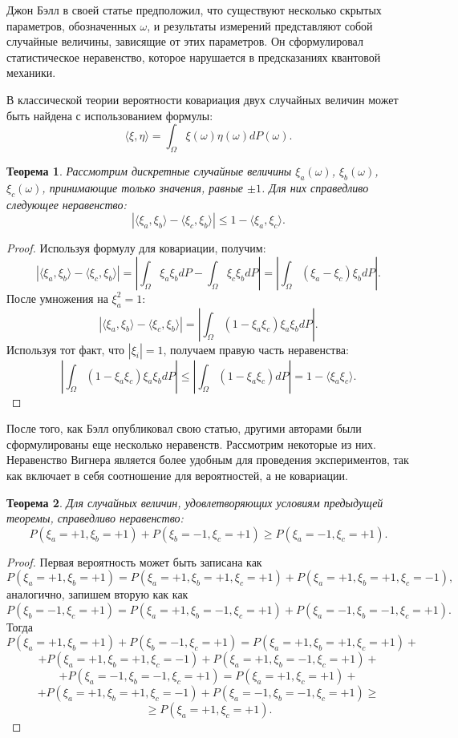 \documentclass[%
master,         %
subf,           %
href,           %
,times         %
]{disser}
\numberwithin{equation}{section}
\numberwithin{figure}{section}
\newtheorem{theorem}{Теорема}[section]
\begin{document}
Джон Бэлл в своей статье \cite{Bell} предположил, что существуют несколько скрытых параметров, обозначенных $\omega$, и результаты измерений представляют собой случайные величины, зависящие от этих параметров. Он сформулировал статистическое неравенство, которое нарушается в предсказаниях квантовой механики. 

В классической теории вероятности ковариация двух случайных величин может быть найдена с использованием формулы:
\[
\langle \xi, \eta \rangle = \int_\Omega \xi(\omega)\eta(\omega)dP(\omega).
\]

\begin{theorem}
Рассмотрим дискретные случайные величины $\xi_a(\omega)$, $\xi_b(\omega)$, $\xi_c(\omega)$, принимающие только значения, равные $\pm 1$. Для них справедливо следующее неравенство:
\[
| \langle\xi_a,\xi_b\rangle -  \langle\xi_c,\xi_b\rangle | \leq 1 - \langle\xi_a,\xi_c\rangle.
\]
\end{theorem}

\begin{proof}
Используя формулу для ковариации, получим:
\[
| \langle\xi_a,\xi_b\rangle -  \langle\xi_c,\xi_b\rangle | = \left| \int_\Omega\xi_a\xi_b dP - \int_\Omega\xi_c\xi_b dP\right| = \left|\int_\Omega (\xi_a - \xi_c)\xi_bdP \right|.
\]
После умножения на $\xi_a^2 = 1$:
\[
| \langle\xi_a,\xi_b\rangle -  \langle\xi_c,\xi_b\rangle | = \left|\int_\Omega (1 - \xi_a\xi_c)\xi_a\xi_bdP \right|.
\]
Используя тот факт, что $|\xi_i| = 1$, получаем правую часть неравенства:
\[
\left|\int_\Omega (1 - \xi_a\xi_c)\xi_a\xi_bdP \right| \leq  \left|\int_\Omega (1 - \xi_a\xi_c)dP\right| = 1 - \langle \xi_a\xi_c\rangle.
\]
\end{proof}

После того, как Бэлл опубликовал свою статью, другими авторами были сформулированы еще несколько неравенств. Рассмотрим некоторые из них. Неравенство Вигнера является более удобным для проведения экспериментов, так как включает в себя соотношение для вероятностей, а не ковариации. 
\begin{theorem}
Для случайных величин, удовлетворяющих условиям предыдущей теоремы, справедливо неравенство:
\[
P(\xi_a = +1, \xi_b = +1) + P(\xi_b = -1, \xi_c = +1) \geq P(\xi_a = -1, \xi_c = +1).
\]
\end{theorem}

\begin{proof}
Первая вероятность может быть записана как
\[
P(\xi_a = +1, \xi_b = +1) = P(\xi_a = +1, \xi_b = +1, \xi_c = +1) + P(\xi_a = +1, \xi_b = +1, \xi_c = -1),
\]
аналогично, запишем вторую как как
\[
P(\xi_b = -1, \xi_c = +1) = P(\xi_a = +1, \xi_b = -1, \xi_c = +1) + P(\xi_a = -1, \xi_b = -1, \xi_c = +1).
\]
Тогда
\[
P(\xi_a = +1, \xi_b = +1) + P(\xi_b = -1, \xi_c = +1) = P(\xi_a = +1, \xi_b = +1, \xi_c = +1) + 
\] 
\[
 + P(\xi_a = +1, \xi_b = +1, \xi_c = -1) + P(\xi_a = +1, \xi_b = -1, \xi_c = +1) + 
\]
\[
 + P(\xi_a = -1, \xi_b = -1, \xi_c = +1) =  P(\xi_a = +1, \xi_c = +1) +
\]
\[
+  P(\xi_a = +1, \xi_b = +1, \xi_c = -1) + P(\xi_a = -1, \xi_b = -1, \xi_c = +1)\geq
\]
\[
 \geq P(\xi_a = +1, \xi_c = +1).
\]
\end{proof}
\end{document}
